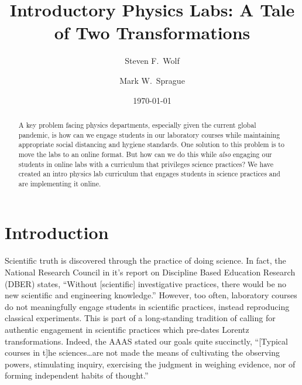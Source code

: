 \documentclass[aip, numerical, preprint]{revtex4-2}
\begin{document}
\title{Introductory Physics Labs: A Tale of Two Transformations}

\author{Steven F.\ Wolf}  \author{Mark W.\ Sprague}
\affiliation{East Carolina University Department of Physics 1000 E.\ 5\textsuperscript{th}
  street, Greenville, NC 27858 USA}

\date{\today}


\begin{abstract}
  A key problem facing physics departments, especially given the current global pandemic, is
  how can we engage students in our laboratory courses while maintaining appropriate social
  distancing and hygiene standards.  One solution to this problem is to move the labs to an
  online format.  But how can we do this while \textit{also} engaging our students in online
  labs with a curriculum that privileges science practices?  We have created an intro physics
  lab curriculum that engages students in science practices and are implementing it online.
\end{abstract}

\maketitle

\section{Introduction}
Scientific truth is discovered through the practice of doing science.  In fact, the National
Research Council in it's report on Discipline Based Education Research (DBER) states, ``Without
[scientific] investigative practices, there would be no new scientific and engineering
knowledge.''\cite{DBERreport} However, too often, laboratory courses do not meaningfully engage
students in scientific practices, instead reproducing classical experiments.\cite{PCAST12} This
is part of a long-standing tradition of calling for authentic engagement in scientific
practices which pre-dates Lorentz transformations.\cite{AAAS1881} Indeed, the AAAS stated our
goals quite succinctly, ``[Typical courses in t]he sciences\ldots are not made the means of
cultivating the observing powers, stimulating inquiry, exercising the judgment in weighing
evidence, nor of forming independent habits of thought.''\cite{AAAS1881}
\end{document}
